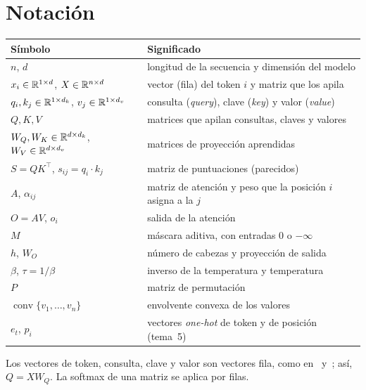 \documentclass[11pt,a4paper,twoside,openany]{book}
\newcommand{\T}{^{\top}}
\newcommand{\conv}{\operatorname{conv}}
\newcommand{\WQ}{W_{Q}}
\newcommand{\WK}{W_{K}}
\newcommand{\WV}{W_{V}}
\newcommand{\WO}{W_{O}}
\begin{document}
\section*{Notación}
\begin{center}
\begin{tabular}{@{}ll@{}}
\toprule
Símbolo & Significado \\
\midrule
$n$, $d$ & longitud de la secuencia y dimensión del modelo \\
$x_i\in\mathbb{R}^{1\times d}$, $X\in\mathbb{R}^{n\times d}$ & vector (fila) del token $i$ y matriz que los apila \\
$q_i,k_j\in\mathbb{R}^{1\times d_k}$, $v_j\in\mathbb{R}^{1\times d_v}$ & consulta (\emph{query}), clave (\emph{key}) y valor (\emph{value}) \\
$Q,K,V$ & matrices que apilan consultas, claves y valores \\
$\WQ,\WK\in\R^{d\times d_k}$, $\WV\in\R^{d\times d_v}$ & matrices de proyección aprendidas \\
$S=QK\T$, $s_{ij}=q_i\cdot k_j$ & matriz de puntuaciones (parecidos) \\
$A$, $\alpha_{ij}$ & matriz de atención y peso que la posición $i$ asigna a la $j$ \\
$O=AV$, $o_i$ & salida de la atención \\
$M$ & máscara aditiva, con entradas $0$ o $-\infty$ \\
$h$, $\WO$ & número de cabezas y proyección de salida \\
$\beta$, $\tau=1/\beta$ & inverso de la temperatura y temperatura \\
$P$ & matriz de permutación \\
$\conv\{v_1,\dots,v_n\}$ & envolvente convexa de los valores \\
$e_t$, $p_i$ & vectores \emph{one-hot} de token y de posición (tema~5) \\
\bottomrule
\end{tabular}
\end{center}
Los vectores de token, consulta, clave y valor son vectores fila, como en~\cite{vaswani} y~\cite{jm3}; así, $Q=X\WQ$. La softmax de una matriz se aplica por filas.


\tableofcontents

\mainmatter






\backmatter

\end{document}
